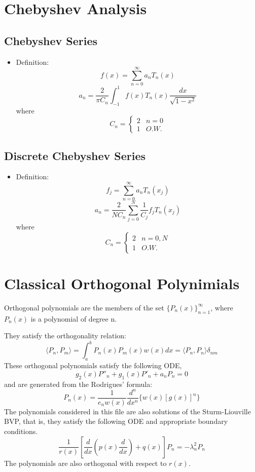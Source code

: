 \documentclass[oneside,a4paper,11pt]{article}
\begin{document}
\section{Chebyshev Analysis}
\subsection{Chebyshev Series}
\begin{itemize}
\item Definition:
\[f(x)=\sum_{n=0}^{\infty}a_nT_n(x)\]
\[a_n=\frac{2}{\pi C_n}\int_{-1}^{1}f(x)T_n(x)\frac{dx}{\sqrt{1-x^2}}\]
where
\[ C_n = \left\{ \begin{array}{cc}  2 & n=0\\ 1 & O.W. \end{array}\right. \]
\end{itemize}

\subsection{Discrete Chebyshev Series}
\begin{itemize}
\item Definition:
\[f_j=\sum_{n=0}^{\infty}a_nT_n(x_j)\]
\[a_n=\frac{2}{NC_n}\sum_{j=0}^{N}\frac{1}{C_j}f_jT_n(x_j)\]
where
\[ C_n = \left\{ \begin{array}{cc}  2 & n=0,N\\ 1 & O.W. \end{array}\right.\]
\end{itemize}

\section{Classical Orthogonal Polynimials}
Orthogonal polynomials are the members of the set $\{P_n(x)\}_{n=1}^{\infty}$, where $P_n(x)$ is a polynomial of degree n.

They satisfy the orthogonality relation:
\[\langle P_n,P_m \rangle = \int_a^b P_n(x)P_m(x)w(x)dx  = \langle P_n,P_n \rangle \delta_{nm}\]
These orthogonal polynomials satisfy the following ODE,
\[g_2(x) P''_n + g_1(x)P'_n + a_nP_n = 0\]
and are generated from the Rodrigues' formula:
\[P_n(x) = \frac{1}{e_nw(x)}\frac{d^n}{dx^n}\{w(x)[g(x)]^n\}\]
The polynomials considered in this file are also solutions of the Sturm-Liouville BVP, that is, they satisfy the following ODE and appropriate boundary conditions.
\[ \frac{1}{r(x)}\left[\frac{d}{dx}\left(p(x)\frac{d}{dx}\right)+q(x)\right]P_n = - \lambda_n^2P_n\]
The polynomials are also orthogonal with respect to $r(x)$.
\end{document}
